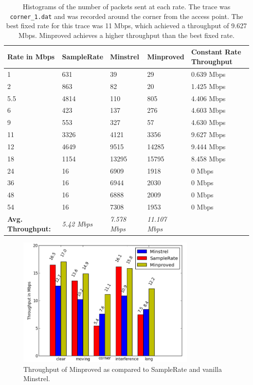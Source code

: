 \documentclass[letterpaper,twocolumn,10pt]{article}
\begin{document}
\begin{table}[htb]
    \centering
    \begin{tabular}{l|l|l|l|l}
    \textbf{Rate in Mbps}     & \textbf{SampleRate} & \textbf{Minstrel}   & \textbf{Minproved}   & \textbf{Constant Rate Throughput}\\ \hline
    1                & 631        & 39         & 29      & 0.639 Mbps    \\
    2                & 863        & 82         & 20      & 1.425 Mbps    \\
    5.5              & 4814       & 110        & 805     & 4.406 Mbps    \\
    6                & 423       & 137        & 276     & 4.603 Mbps    \\
    9                & 553         & 327        & 57      & 4.630 Mbps   \\
    11               & 3326       & 4121       & 3356    & 9.627 Mbps   \\
    12               & 4649       & 9515       & 14285   & 9.444 Mbps   \\
    18               & 1154         & 13295      & 15795   & 8.458 Mbps    \\
    24               & 16         & 6909       & 1918    & 0 Mbps   \\
    36               & 16         & 6944       & 2030    & 0 Mbps   \\
    48               & 16         & 6888       & 2009    & 0 Mbps   \\
    54               & 16         & 7308       & 1953    & 0 Mbps   \\ \hline
    \textbf{Avg. Throughput:} & \emph{5.42 Mbps}  & \emph{7.578 Mbps} & \emph{11.107 Mbps} \\
    \end{tabular}
    \caption{Histograms of the number of packets sent at each rate.  The trace was \texttt{corner\_1.dat} and was recorded around the corner from the access point. The best fixed rate for this trace was 11 Mbps, which achieved a throughput of 9.627 Mbps. Minproved achieves a higher throughput than the best fixed rate.}
\label{table:2}
\end{table}

\begin{figure}[htb]
  \hspace{-2em}\includegraphics[width=3.5in]{mnVSspVSmp1.png}\vspace{-0em}
  \caption{Throughput of Minproved as compared to SampleRate and vanilla Minstrel.}
\label{figure:4}
\end{figure}
\end{document}
